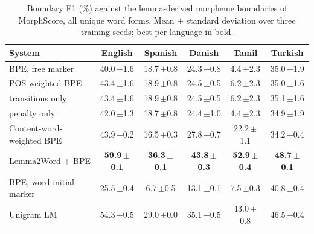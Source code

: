 \begin{table}[!ht]
\centering
\caption{Boundary F1 (\%) against the lemma-derived morpheme boundaries of MorphScore, all unique word forms. Mean $\pm$ standard deviation over three training seeds; best per language in bold.}
\label{tab:f1}
\small
\setlength{\tabcolsep}{4pt}
\begin{tabular}{lccccc}
\toprule
System & English & Spanish & Danish & Tamil & Turkish \\
\midrule
BPE, free marker & 40.0\,{\scriptsize$\pm$1.6} & 18.7\,{\scriptsize$\pm$0.8} & 24.3\,{\scriptsize$\pm$0.8} & 4.4\,{\scriptsize$\pm$2.3} & 35.0\,{\scriptsize$\pm$1.9} \\
POS-weighted BPE & 43.4\,{\scriptsize$\pm$1.6} & 18.9\,{\scriptsize$\pm$0.8} & 24.5\,{\scriptsize$\pm$0.5} & 6.2\,{\scriptsize$\pm$2.3} & 35.0\,{\scriptsize$\pm$1.6} \\
\quad transitions only & 43.4\,{\scriptsize$\pm$1.6} & 18.9\,{\scriptsize$\pm$0.8} & 24.5\,{\scriptsize$\pm$0.5} & 6.2\,{\scriptsize$\pm$2.3} & 35.1\,{\scriptsize$\pm$1.6} \\
\quad penalty only & 42.0\,{\scriptsize$\pm$1.3} & 18.7\,{\scriptsize$\pm$0.8} & 24.4\,{\scriptsize$\pm$1.0} & 4.4\,{\scriptsize$\pm$2.3} & 34.9\,{\scriptsize$\pm$1.9} \\
\addlinespace[2pt]
Content-word-weighted BPE & 43.9\,{\scriptsize$\pm$0.2} & 16.5\,{\scriptsize$\pm$0.3} & 27.8\,{\scriptsize$\pm$0.7} & 22.2\,{\scriptsize$\pm$1.1} & 34.2\,{\scriptsize$\pm$0.4} \\
Lemma2Word + BPE & \textbf{59.9\,{\scriptsize$\pm$0.1}} & \textbf{36.3\,{\scriptsize$\pm$0.1}} & \textbf{43.8\,{\scriptsize$\pm$0.3}} & \textbf{52.9\,{\scriptsize$\pm$0.4}} & \textbf{48.7\,{\scriptsize$\pm$0.1}} \\
BPE, word-initial marker & 25.5\,{\scriptsize$\pm$0.4} & 6.7\,{\scriptsize$\pm$0.5} & 13.1\,{\scriptsize$\pm$0.1} & 7.5\,{\scriptsize$\pm$0.3} & 40.8\,{\scriptsize$\pm$0.4} \\
Unigram LM & 54.3\,{\scriptsize$\pm$0.5} & 29.0\,{\scriptsize$\pm$0.0} & 35.1\,{\scriptsize$\pm$0.5} & 43.0\,{\scriptsize$\pm$0.8} & 46.5\,{\scriptsize$\pm$0.4} \\
\bottomrule
\end{tabular}
\end{table}
